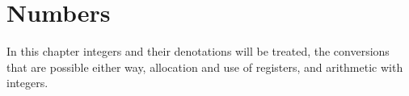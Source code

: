 \documentclass{book}
\begin{document}
\chapter{Numbers}\label{number}

In this chapter integers and their
denotations will be treated,
the conversions that are possible either way, 
allocation and use of  registers, and
arithmetic with integers.

\label{cschap:number}\label{cschap:romannumeral}\label{cschap:count}\label{cschap:countdef}\label{cschap:newcount}\label{cschap:advance}\label{cschap:multiply}\label{cschap:divide}
\end{document}
